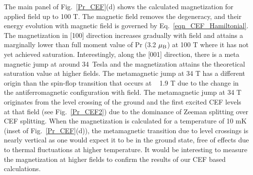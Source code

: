 \documentclass[preprint,showpacs,preprintnumbers,amsmath,amssymb, prb]{revtex4}
\begin{document}
The main panel of Fig.~\ref{Pr_CEF}(d) shows the  calculated magnetization for applied field up to 100 T. The magnetic field removes the degeneracy, and their energy evolution with magnetic field is governed by Eq.~\ref{eqn_CEF_Hamiltonial}. The magnetization in [100] direction increases gradually with field and attains a marginally lower than full moment value of Pr (3.2 $\mu_{\rm B}$) at 100 T where it has not yet achieved saturation. Interestingly, along the [001] direction, there is a meta magnetic jump at around  34~Tesla and the magnetization attains the theoretical saturation value at higher fields. The metamagnetic jump at 34 T has a different origin than the spin-flop transition that occurs at ~ 1.9 T due to the change in the antiferromagnetic configuration with field. The metamagnetic jump at 34 T originates from the level crossing of the ground and the first excited CEF levels at that field (see Fig.~\ref{Pr_CEF2}) due to the dominance of Zeeman splitting over CEF splitting. When the magnetization is calculated for a temperature of 10 mK (inset of Fig.~\ref{Pr_CEF}(d)), the metamagnetic transition due to level crossings is nearly vertical as one would expect it to be in the ground state, free of effects due to thermal fluctuations at higher temperature. It would be interesting to measure the magnetization at higher fields to confirm the results of our CEF based calculations.
%
\end{document}
